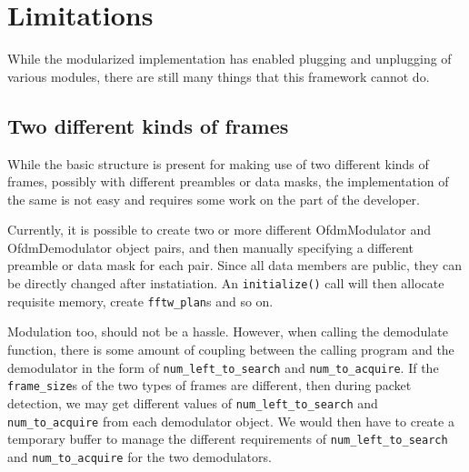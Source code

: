 
\section{Limitations}

While the modularized implementation has enabled plugging and unplugging of
various modules, there are still many things that this framework cannot do.

\subsection{Two different kinds of frames}

While the basic structure is present for making use of two different kinds of
frames, possibly with different preambles or data masks, the implementation of
the same is not easy and requires some work on the part of the developer.

Currently, it is possible to create two or more different OfdmModulator and
OfdmDemodulator object pairs, and then manually specifying a different preamble
or data mask for each pair. Since all data members are public, they can be
directly changed after instatiation. An \lstinline!initialize()! call will then
allocate requisite memory, create \lstinline!fftw_plan!s and so on.

Modulation too, should not be a hassle. However, when calling the demodulate
function, there is some amount of coupling between the calling program and the
demodulator in the form of \lstinline!num_left_to_search! and
\lstinline!num_to_acquire!. If the \lstinline!frame_size!s of the two types
of frames are different, then during packet detection, we may get different
values of \lstinline!num_left_to_search! and \lstinline!num_to_acquire!
from each demodulator object. We would then have to create a temporary buffer
to manage the different requirements of \lstinline!num_left_to_search! and
\lstinline!num_to_acquire! for the two demodulators.

\begin{sloppypar}
\end{sloppypar}

